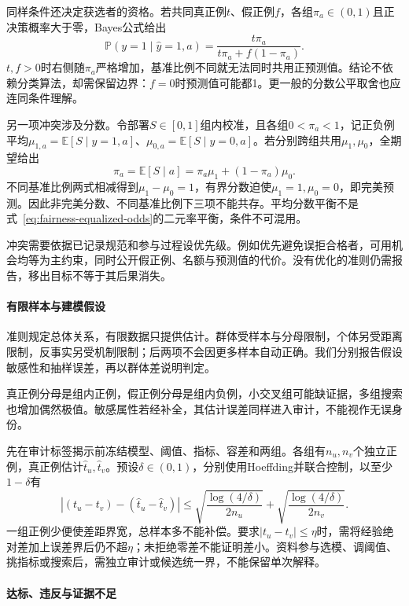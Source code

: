 同样条件还决定获选者的资格。若共同真正例$t$、假正例$f$，各组$\pi_a\in(0,1)$且正决策概率大于零，Bayes公式给出
\begin{equation}
 \mathbb P(y=1\mid\hat y=1,a)
 =\frac{t\pi_a}{t\pi_a+f(1-\pi_a)}.
 \label{eq:fairness-predictive-value}
\end{equation}
$t,f>0$时右侧随$\pi_a$严格增加，基准比例不同就无法同时共用正预测值。结论不依赖分类算法，却需保留边界：$f=0$时预测值可能都1。更一般的分数公平取舍也应连同条件理解。

另一项冲突涉及分数。令部署$S\in[0,1]$组内校准，且各组$0<\pi_a<1$，记正负例平均$\mu_{1,a}=\mathbb E[S\mid y=1,a]$、$\mu_{0,a}=\mathbb E[S\mid y=0,a]$。若分别跨组共用$\mu_1,\mu_0$，全期望给出
\[
 \pi_a=\mathbb E[S\mid a]
       =\pi_a\mu_1+(1-\pi_a)\mu_0.
\]
不同基准比例两式相减得到$\mu_1-\mu_0=1$，有界分数迫使$\mu_1=1,\mu_0=0$，即完美预测。因此非完美分数、不同基准比例下三项不能共存。平均分数平衡不是式~\eqref{eq:fairness-equalized-odds}的二元率平衡，条件不可混用。

冲突需要依据已记录规范和参与过程设优先级。例如优先避免误拒合格者，可用机会均等为主约束，同时公开假正例、名额与预测值的代价。没有优化的准则仍需报告，移出目标不等于其后果消失。

\paragraph{有限样本与建模假设}
\label{sec:fairness-evidence}

准则规定总体关系，有限数据只提供估计。群体受样本与分母限制，个体另受距离限制，反事实另受机制限制；后两项不会因更多样本自动正确。我们分别报告假设敏感性和抽样误差，再以群体差说明判定。

真正例分母是组内正例，假正例分母是组内负例，小交叉组可能缺证据，多组搜索也增加偶然极值。敏感属性若经补全，其估计误差同样进入审计，不能视作无误身份。

先在审计标签揭示前冻结模型、阈值、指标、容差和两组。各组有$n_u,n_v$个独立正例，真正例估计$\hat t_u,\hat t_v$。预设$\delta\in(0,1)$，分别使用Hoeffding并联合控制，以至少$1-\delta$有
\[
 |(t_u-t_v)-(\hat t_u-\hat t_v)|
 \leq
 \sqrt{\frac{\log(4/\delta)}{2n_u}}
 +\sqrt{\frac{\log(4/\delta)}{2n_v}}.
\]
一组正例少便使差距界宽，总样本多不能补偿。要求$|t_u-t_v|\leq\eta$时，需将经验绝对差加上误差界后仍不超$\eta$；未拒绝零差不能证明差小。资料参与选模、调阈值、挑指标或搜索后，需独立审计或候选统一界，不能保留单次解释。

\paragraph{达标、违反与证据不足}

